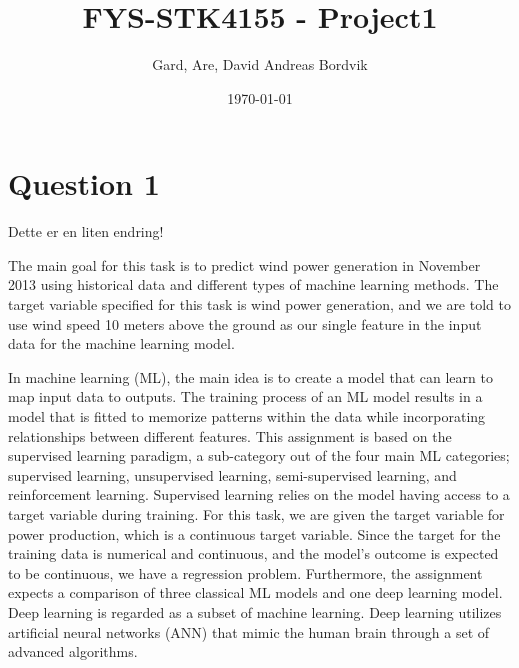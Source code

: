 \documentclass[11pt]{article}
\title{FYS-STK4155 - Project1}
\author{Gard, Are, David Andreas Bordvik}
\date{\today}
\begin{document}
\maketitle

\section*{Question 1}

Dette er en liten endring!

The main goal for this task is to predict wind power generation in November 2013 using historical data and different types of machine learning methods. The target variable specified for this task is wind power generation, and we are told to use wind speed 10 meters above the ground as our single feature in the input data for the machine learning model.

In machine learning (ML), the main idea is to create a model that can learn to map input data to outputs. The training process of an ML model results in a model that is fitted to memorize patterns within the data while incorporating relationships between different features. This assignment is based on the supervised learning paradigm, a sub-category out of the four main ML categories; supervised learning, unsupervised learning, semi-supervised learning, and reinforcement learning. Supervised learning relies on the model having access to a target variable during training. For this task, we are given the target variable for power production, which is a continuous target variable. Since the target for the training data is numerical and continuous, and the model's outcome is expected to be continuous, we have a regression problem. Furthermore, the assignment expects a comparison of three classical ML models and one deep learning model. Deep learning is regarded as a subset of machine learning. Deep learning utilizes artificial neural networks (ANN) that mimic the human brain through a set of advanced algorithms. 
\end{document}
